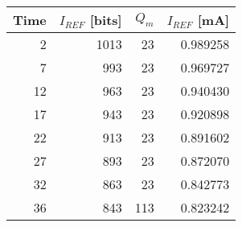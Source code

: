 \begin{tabular}{rrrr}
\toprule
 Time &  $I_{REF}$ [bits] &  $Q_m$ &  $I_{REF}$ [mA] \\
\midrule
    2 &   1013 &   23 &    0.989258 \\
    7 &    993 &   23 &    0.969727 \\
   12 &    963 &   23 &    0.940430 \\
   17 &    943 &   23 &    0.920898 \\
   22 &    913 &   23 &    0.891602 \\
   27 &    893 &   23 &    0.872070 \\
   32 &    863 &   23 &    0.842773 \\
   36 &    843 &   113 &   0.823242 \\
\bottomrule
\end{tabular}
